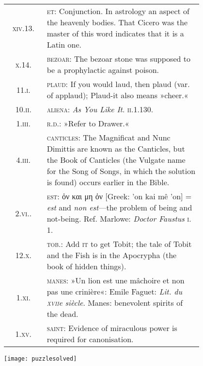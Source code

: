 \begin{longtable} {c p{0.8\linewidth}}
\textsc{xiv}.13. & \textsc{et}: Conjunction. In astrology an aspect of the heavenly bodies. That Cicero was the master of this word indicates that it is a Latin one.\\

\textsc{x}.14. & \textsc{bezoar}: The bezoar stone was supposed to be a prophylactic against poison.\\

11.\textsc{i.} & \textsc{plaud}: If you would laud, then plaud (var. of applaud); Plaud-it also means »cheer.«\\

10.\textsc{ii.} &  \textsc{aliena}: \textit{As You Like It}. \textsc{ii}.1.130.\\

1.\textsc{iii.} &  \textsc{r.d.}: »Refer to Drawer.«\\

4.\textsc{iii.} &  \textsc{canticles}: The Magnificat and Nunc Dimittis are known as the Canticles, but the Book of Canticles (the Vulgate name for the Song of Songs, in which the solution is found) occurs earlier in the Bible.\\

2.\textsc{vi.}. &  \textsc{est}: ὀν και μη ὀν [Greek: 'on kai mê 'on] = \textit{est} and \textit{non est}—the problem of being and not-being. Ref. Marlowe: \textit{Doctor Faustus} \textsc{i}. 1.\\

12.\textsc{x.} &  \textsc{tob}.: Add \textsc{it} to get Tobit; the tale of Tobit and the Fish is in the Apocrypha (the book of hidden things).\\

1.\textsc{xi.} &  \textsc{manes}: »Un lion est une mâchoire et non pas une crinière«: Emile Faguet: \textit{Lit. du \textsc{xvii}e siècle}. Manes: benevolent spirits of the dead.\\

1.\textsc{xv}. &  \textsc{saint}: Evidence of miraculous power is required for canonisation.\\
\end{longtable}

\texttt{[image: puzzlesolved]}